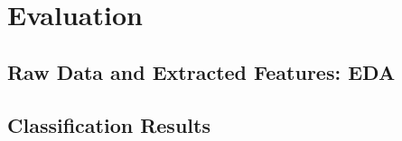 
\section{Evaluation}
\label{sec:evaluation}

\subsection{Raw Data and Extracted Features: EDA}

\subsection{Classification Results}


